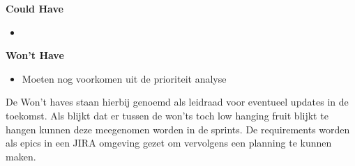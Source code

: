 \textbf{Could Have}
\begin{itemize}
\item
\end{itemize}

\textbf{Won't Have}
\begin{itemize}
  \item Moeten nog voorkomen uit de prioriteit analyse
\end{itemize}
De Won't haves staan hierbij genoemd als leidraad voor eventueel updates in de toekomst.
Als blijkt dat er tussen de won'ts toch low hanging fruit blijkt te hangen kunnen deze meegenomen worden in de sprints.
De requirements worden als epics in een JIRA omgeving gezet om vervolgens een planning te kunnen maken.

